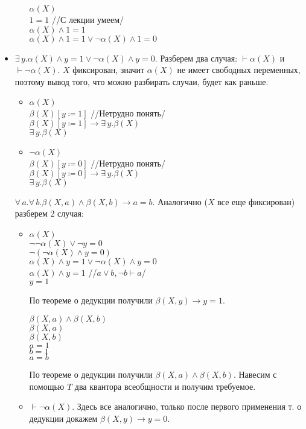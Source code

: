 \documentclass[12pt]{article}
\begin{document}
\begin{itemize}
\begin{itemize}
		$\alpha(X)$\\
		$1=1$ //С лекции умеем/\\
		$\alpha(X)\wedge1=1$\\
		$\alpha(X)\wedge1=1\vee\neg\alpha(X)\wedge1=0$
	\end{itemize}
	\item $\exists\,y.\alpha(X)\wedge y=1\vee\neg\alpha(X)\wedge y=0$. Разберем два случая: $\vdash\alpha(X)$ и $\vdash\neg\alpha(X)$. $X$ фиксирован, значит $\alpha(X)$ не имеет свободных переменных, поэтому вывод того, что можно разбирать случаи, будет как раньше. %
	\begin{itemize}
		\item $\alpha(X)$\\
		$\beta(X)[y\coloneqq 1]$ //Нетрудно понять/\\
		$\beta(X)[y\coloneqq 1]\to\exists\,y.\beta(X)$\\
		$\exists\,y.\beta(X)$
		\item $\neg\alpha(X)$\\
		$\beta(X)[y\coloneqq 0]$ //Нетрудно понять/\\
		$\beta(X)[y\coloneqq 0]\to\exists\,y.\beta(X)$\\
		$\exists\,y.\beta(X)$
	\end{itemize}
	$\forall\,a.\forall\,b.\beta(X,a)\wedge\beta(X,b)\to a=b$. Аналогично ($X$ все еще фиксирован) разберем 2 случая:
	\begin{itemize}
		\item $\alpha(X)$\\
		$\neg\neg\alpha(X)\vee\neg y=0$\\
		$\neg(\neg\alpha(X)\wedge y=0)$\\
		$\alpha(X)\wedge y=1\vee\neg\alpha(X)\wedge y=0$\\
		$\alpha(X)\wedge y=1$ //$a\vee b,\neg b\vdash a$/\\
		$y=1$
		
		По теореме о дедукции получили $\beta(X,y)\to y=1$.
		
		$\beta(X,a)\wedge\beta(X,b)$\\
		$\beta(X,a)$\\
		$\beta(X,b)$\\
		$a=1$\\
		$b=1$\\
		$a=b$
		
		По теореме о дедукции получили $\beta(X,a)\wedge\beta(X,b)$. Навесим с помощью $T$ два квантора всеобщности и получим требуемое.
		\item $\vdash\neg\alpha(X)$. Здесь все аналогично, только после первого применения т. о дедукции докажем $\beta(X,y)\to y=0$. 
	\end{itemize}
\end{itemize}
\end{document}
